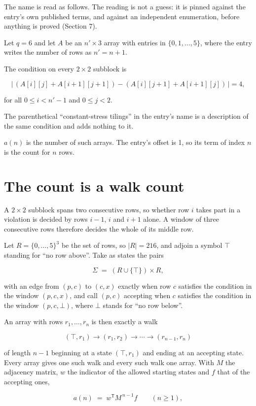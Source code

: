 \documentclass[11pt]{article}
\theoremstyle{definition}
\begin{document}
The name is read as follows. The reading is not a guess: it is pinned against the entry's own published terms, and against an independent enumeration, before anything is proved (Section 7).

Let $q = 6$ and let $A$ be an $n' \times 3$ array with entries in $\{0,1,\dots,5\}$, where the entry writes the number of rows as $n' = n + 1$.

The condition on every $2 \times 2$ subblock is

\[\bigl|\,(A[i][j] + A[i{+}1][j{+}1]) - (A[i][j{+}1] + A[i{+}1][j])\,\bigr| = 4,\]

for all $0 \le i < n'-1$ and $0 \le j < 2$.

The parenthetical ``constant-stress tilings'' in the entry's name is a description of the same condition and adds nothing to it.

$a(n)$ is the number of such arrays. The entry's offset is 1, so its term of index $n$ is the count for $n$ rows.

\section{The count is a walk count}

A $2 \times 2$ subblock spans two consecutive rows, so whether row $i$ takes part in a violation is decided by rows $i-1$, $i$ and $i+1$ alone. A window of three consecutive rows therefore decides the whole of its middle row.

Let $R = \{0,\dots,5\}^{3}$ be the set of rows, so $|R| = 216$, and adjoin a symbol $\top$ standing for ``no row above''. Take as states the pairs

\[\Sigma \;=\; (R \cup \{\top\}) \times R,\]

with an edge from $(p,c)$ to $(c,x)$ exactly when row $c$ satisfies the condition in the window $(p,c,x)$, and call $(p,c)$ accepting when $c$ satisfies the condition in the window $(p,c,\bot)$, where $\bot$ stands for ``no row below''.

An array with rows $r_1,\dots,r_n$ is then exactly a walk

\[(\top,r_1) \to (r_1,r_2) \to \cdots \to (r_{n-1},r_n)\]

of length $n-1$ beginning at a state $(\top,r_1)$ and ending at an accepting state. Every array gives one such walk and every such walk one array. With $M$ the adjacency matrix, $w$ the indicator of the allowed starting states and $f$ that of the accepting ones,

\[a(n) \;=\; w^{\mathsf T} M^{\,n-1} f \qquad (n \ge 1),\]
\end{document}
